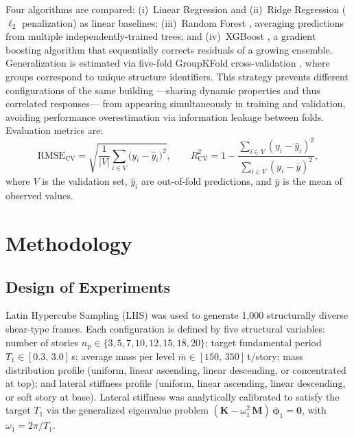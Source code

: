 \documentclass[preprint,12pt,authoryear]{elsarticle}
\newcommand{\RMSE}{\mathrm{RMSE_{CV}}}       %
\newcommand{\Rsq}{R^{2}_{\mathrm{CV}}}
\newcommand{\np}{n_{\mathrm{p}}}              %
\begin{document}
Four algorithms are compared: (i)~Linear Regression and (ii)~Ridge Regression ($\ell_2$ penalization)
as linear baselines; (iii)~Random Forest \citep{Breiman2001}, averaging predictions from multiple
independently-trained trees; and (iv)~XGBoost \citep{Chen2016}, a gradient boosting algorithm that
sequentially corrects residuals of a growing ensemble. Generalization is estimated via five-fold
GroupKFold cross-validation \citep{Kazemi2022}, where groups correspond to unique structure identifiers.
This strategy prevents different configurations of the same building ---sharing dynamic properties and
thus correlated responses--- from appearing simultaneously in training and validation, avoiding performance
overestimation via information leakage between folds. Evaluation metrics are:
\begin{equation}
    \RMSE = \sqrt{\frac{1}{|V|}\sum_{i \in V}\bigl(y_i - \hat{y}_i\bigr)^2},
    \qquad
    \Rsq  = 1 - \frac{\sum_{i \in V}(y_i - \hat{y}_i)^2}
                      {\sum_{i \in V}(y_i - \bar{y})^2},
    \label{eq:metrics}
\end{equation}
where $V$ is the validation set, $\hat{y}_i$ are out-of-fold predictions, and $\bar{y}$ is the mean of
observed values.

\section{Methodology}
\label{sec:method}

\subsection{Design of Experiments}
\label{sec:method:doe}

Latin Hypercube Sampling (LHS) \citep{McKay1979} was used to generate 1,000 structurally diverse
shear-type frames. Each configuration is defined by five structural variables: number of stories
$\np \in \{3, 5, 7, 10, 12, 15, 18, 20\}$; target fundamental period $T_1 \in [0.3,\,3.0]$\,s;
average mass per level $\bar{m} \in [150,\,350]$\,t/story; mass distribution profile (uniform, linear
ascending, linear descending, or concentrated at top); and lateral stiffness profile (uniform, linear
ascending, linear descending, or soft story at base). Lateral stiffness was analytically calibrated to
satisfy the target $T_1$ via the generalized eigenvalue problem $(\bm{K} - \omega_1^2\,\bm{M})\,\bm{\phi}_1 = \bm{0}$,
with $\omega_1 = 2\pi/T_1$.
\end{document}
